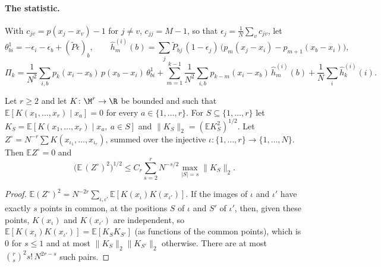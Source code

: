 
\paragraph{The statistic.} With $c_{jv}=p(x_j-x_v)-1$ for $j\ne v$, $c_{jj}=M-1$, so that
$\epsilon_j=\frac1N\sum_vc_{jv}$, let
\[
 \theta^1_{bi}=-\epsilon_i-\epsilon_b+(\tilde P\epsilon)_b,\qquad
 \hat h^{(i)}_m(b)=\sum_j\tilde P_{bj}\,(1-\epsilon_j)\,\big(p_m(x_j-x_i)-p_{m+1}(x_b-x_i)\big),
\]
\[
 \Pi_k=\frac1{N^2}\sum_{i,b}p_k(x_i-x_b)\,p(x_b-x_i)\,\theta^1_{bi}
 +\sum_{m=1}^{k-1}\frac1{N^2}\sum_{i,b}p_{k-m}(x_i-x_b)\,\hat h^{(i)}_m(b)
 +\frac1N\sum_i\hat h^{(i)}_k(i).
\]

\begin{lemma}\label{lem:degenerate}
Let $r\ge2$ and let $K\colon\M^r\to\R$ be bounded and such that
$\mathbb E[K(x_1,\dots,x_r)\mid x_a]=0$ for every $a\in\{1,\dots,r\}$. For $S\subseteq\{1,\dots,r\}$ let
$K_S=\mathbb E[K(x_1,\dots,x_r)\mid x_a,\ a\in S]$ and $\|K_S\|_2=(\mathbb E K_S^2)^{1/2}$. Let
$Z^\circ=N^{-r}\sum K(x_{\iota_1},\dots,x_{\iota_r})$, summed over the injective
$\iota\colon\{1,\dots,r\}\to\{1,\dots,N\}$. Then $\mathbb E Z^\circ=0$ and
\[
 \big(\mathbb E\,(Z^\circ)^2\big)^{1/2}\le C_r\sum_{s=2}^rN^{-s/2}\max_{|S|=s}\|K_S\|_2 .
\]
\end{lemma}
\begin{proof}
$\mathbb E(Z^\circ)^2=N^{-2r}\sum_{\iota,\iota'}\mathbb E[K(x_\iota)K(x_{\iota'})]$. If the images of $\iota$
and $\iota'$ have exactly $s$ points in common, at the positions $S$ of $\iota$ and $S'$ of $\iota'$, then,
given these points, $K(x_\iota)$ and $K(x_{\iota'})$ are independent, so
$\mathbb E[K(x_\iota)K(x_{\iota'})]=\mathbb E[K_SK_{S'}]$ (as functions of the common points), which is
$0$ for $s\le1$ and at most $\|K_S\|_2\|K_{S'}\|_2$ otherwise. There are at most
$\binom rs^2s!\,N^{2r-s}$ such pairs.
\end{proof}

